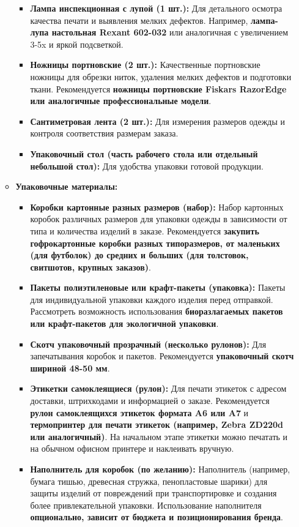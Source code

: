 \begin{itemize}
\begin{itemize}
\begin{itemize}
                    \item \textbf{Лампа инспекционная с лупой (1 шт.):}  Для детального осмотра качества печати и выявления мелких дефектов.  Например, \textbf{лампа-лупа настольная Rexant 602-032} или аналогичная с увеличением 3-5x и яркой подсветкой.
                    \item \textbf{Ножницы портновские (2 шт.):}  Качественные портновские ножницы для обрезки ниток, удаления мелких дефектов и подготовки ткани.  Рекомендуется \textbf{ножницы портновские Fiskars RazorEdge или аналогичные профессиональные модели}.
                    \item \textbf{Сантиметровая лента (2 шт.):}  Для измерения размеров одежды и контроля соответствия размерам заказа.
                    \item \textbf{Упаковочный стол (часть рабочего стола или отдельный небольшой стол):}  Для удобства упаковки готовой продукции.
                \end{itemize}
            \item \textbf{Упаковочные материалы:}
                \begin{itemize}
                    \item \textbf{Коробки картонные разных размеров (набор):}  Набор картонных коробок различных размеров для упаковки одежды в зависимости от типа и количества изделий в заказе.  Рекомендуется \textbf{закупить гофрокартонные коробки разных типоразмеров, от маленьких (для футболок) до средних и больших (для толстовок, свитшотов, крупных заказов)}.
                    \item \textbf{Пакеты полиэтиленовые или крафт-пакеты (упаковка):}  Пакеты для индивидуальной упаковки каждого изделия перед отправкой.  Рассмотреть возможность использования \textbf{биоразлагаемых пакетов или крафт-пакетов для экологичной упаковки}.
                    \item \textbf{Скотч упаковочный прозрачный (несколько рулонов):}  Для запечатывания коробок и пакетов.  Рекомендуется \textbf{упаковочный скотч шириной 48-50 мм}.
                    \item \textbf{Этикетки самоклеящиеся (рулон):}  Для печати этикеток с адресом доставки, штрихкодами и информацией о заказе.  Рекомендуется \textbf{рулон самоклеящихся этикеток формата A6 или A7} и \textbf{термопринтер для печати этикеток (например, Zebra ZD220d или аналогичный)}.  На начальном этапе этикетки можно печатать и на обычном офисном принтере и наклеивать вручную.
                    \item \textbf{Наполнитель для коробок (по желанию):}  Наполнитель (например, бумага тишью, древесная стружка, пенопластовые шарики) для защиты изделий от повреждений при транспортировке и создания более привлекательной упаковки.  Использование наполнителя \textbf{опционально, зависит от бюджета и позиционирования бренда}.

\end{itemize}
\end{itemize}
\end{itemize}
